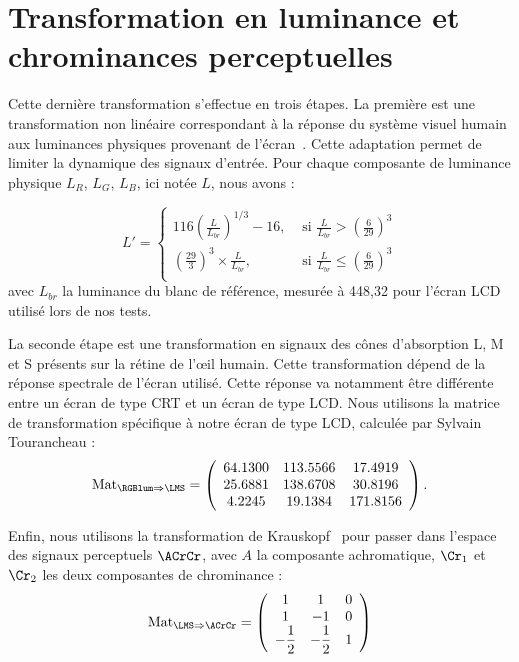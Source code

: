 \section{Transformation en luminance et chrominances perceptuelles}
Cette dernière transformation s'effectue en trois étapes. La première est une transformation non linéaire correspondant à la réponse du système visuel humain aux luminances physiques provenant de l'écran~\cite{poynton-faqColor}. Cette adaptation permet de limiter la dynamique des signaux d'entrée. Pour chaque composante de luminance physique $L_R$, $L_G$, $L_B$, ici notée $L$, nous avons :

\begin{equation}
L' = \begin{cases}
116(\frac{L}{L_{\textit{br}}})^{1/3} - 16, 				& \text{ si } \frac{L}{L_{\textit{br}}} > (\frac{6}{29})^3\\
(\frac{29}{3})^3\times\frac{L}{L_{\textit{br}}}, 		& \text{ si } \frac{L}{L_{\textit{br}}} \leqslant (\frac{6}{29})^3\\
\end{cases}
\end{equation}
%
avec $L_{\textit{br}}$ la luminance du blanc de référence, mesurée à 448,32 pour l'écran LCD utilisé lors de nos tests.

La seconde étape est une transformation en signaux des cônes d'absorption L, M et S présents sur la rétine de l'\oe il humain. Cette transformation dépend de la réponse spectrale de l'écran utilisé. Cette réponse va notamment être différente entre un écran de type CRT et un écran de type LCD. Nous utilisons la matrice de transformation spécifique à notre écran de type LCD, calculée par Sylvain Tourancheau :
\begin{equation}
\text{Mat}_{\RGBlum \Rightarrow \LMS} =\left(
\begin{array}{ccc}
64.1300 & 113.5566 & 17.4919\\
25.6881 & 138.6708 & 30.8196\\
4.2245  & 19.1384  & 171.8156\\
\end{array}\right).
\end{equation}

Enfin, nous utilisons la transformation de Krauskopf~\cite{krauskopf-vr1982} pour passer dans l'espace des signaux perceptuels $\ACrCr$, avec $A$ la composante achromatique, $\Cr_1$ et $\Cr_2$ les deux composantes de chrominance :
\begin{equation}
\text{Mat}_{\LMS \Rightarrow \ACrCr} =\left(
\begin{array}{ccc}
1		&  1		& 0\\
1		& -1 		& 0\\
-\dfrac{1}{2}	& -\dfrac{1}{2}	& 1\\
\end{array}\right)
\end{equation}


